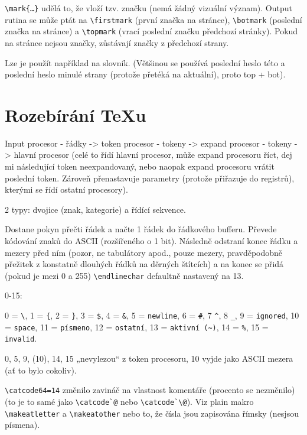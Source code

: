 \documentclass[12pt]{article}					%
\begin{document}

    \begin{definice}[Značky]
        \verb|\mark{…}| udělá to, že vloží tzv. značku (nemá žádný vizuální význam). Output rutina se může ptát na \verb|\firstmark| (první značka na stránce), \verb|\botmark| (poslední značka na stránce) a \verb|\topmark| (vrací poslední značku předchozí stránky). Pokud na stránce nejsou značky, zůstávají značky z předchozí strany.

        Lze je použít například na slovník. (Většinou se používá poslední heslo této a poslední heslo minulé strany (protože přetéká na aktuální), proto top + bot).
    \end{definice}

\section{Rozebírání \TeX{}u}
    Input procesor - řádky -> token procesor - tokeny -> expand procesor - tokeny -> hlavní procesor (celé to řídí hlavní procesor, může expand procesoru říct, dej mi následující token neexpandovaný, nebo naopak expand procesoru vrátit poslední token. Zároveň přenastavuje parametry (protože přiřazuje do registrů), kterými se řídí ostatní procesory).

    \begin{definice}[Token]
        2 typy: dvojice (znak, kategorie) a řídící sekvence.
    \end{definice}

    \begin{definice}
        Dostane pokyn přečti řádek a načte 1 řádek do řádkového bufferu. Převede kódování znaků do ASCII (rozšířeného o 1 bit). Následně odstraní konec řádku a mezery před ním (pozor, ne tabulátory apod., pouze mezery, pravděpodobně přežitek z konstatně dlouhých řádků na děrných štítcích) a na konec se přidá (pokud je mezi 0 a 255) \verb|\endlinechar| defaultně nastavený na 13.
    \end{definice}

    \begin{definice}[Kategorie]
        0-15:

        0 = \verb|\|, 1 = \verb|{|, 2 = \verb|}|, 3 = \verb|$|, 4 = \verb|&|, 5 = \verb|newline|, 6 = \verb|#|, 7 \verb|^|, 8 \verb|_|, 9 = \verb|ignored|, 10 = \verb|space|, 11 = \verb|písmeno|, 12 = \verb|ostatní|, 13 = \verb|aktivní (~)|, 14 = \verb|%|, 15 = \verb|invalid|.

        0, 5, 9, (10), 14, 15 „nevylezou“ z token procesoru, 10 vyjde jako ASCII mezera (ať to bylo cokoliv).

        \verb|\catcode64=14| změnilo zavináč na vlastnost komentáře (procento se nezměnilo) (to je to samé jako \verb|\catcode`@| nebo \verb|\catcode`\@|). Viz plain makro \verb|\makeatletter| a \verb|\makeatother| nebo to, že čísla jsou zapisována římsky (nesjsou písmena).
    \end{definice}
\end{document}
